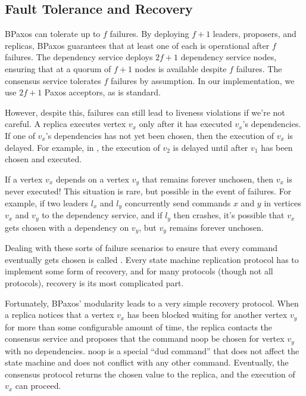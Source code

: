 \subsection{Fault Tolerance and Recovery}
BPaxos can tolerate up to $f$ failures. By deploying $f+1$ leaders, proposers,
and replicas, BPaxos guarantees that at least one of each is operational after
$f$ failures. The dependency service deploys $2f+1$ dependency service nodes,
ensuring that at a quorum of $f+1$ nodes is available despite $f$ failures. The
consensus service tolerates $f$ failures by assumption. In our implementation,
we use $2f+1$ Paxos acceptors, as is standard.

However, despite this, failures can still lead to liveness violations if we're
not careful. A replica executes vertex $v_x$ only after it has executed $v_x$'s
dependencies. If one of $v_x$'s dependencies has not yet been chosen, then the
execution of $v_x$ is delayed. For example, in ,
the execution of $v_2$ is delayed until after $v_1$ has been chosen and
executed.

If a vertex $v_x$ depends on a vertex $v_y$ that remains forever unchosen, then
$v_x$ is never executed! This situation is rare, but possible in the event of
failures. For example, if two leaders $l_x$ and $l_y$ concurrently send
commands $x$ and $y$ in vertices $v_x$ and $v_y$ to the dependency service, and
if $l_y$ then crashes, it's possible that $v_x$ gets chosen with a dependency
on $v_y$, but $v_y$ remains forever unchosen.

Dealing with these sorts of failure scenarios to ensure that every command
eventually gets chosen is called . Every state machine
replication protocol has to implement some form of recovery, and for many
protocols (though not all protocols), recovery is its most complicated part.

\newcommand{\noop}{\text{noop}}
Fortunately, BPaxos' modularity leads to a very simple recovery protocol. When
a replica notices that a vertex $v_x$ has been blocked waiting for another
vertex $v_y$ for more than some configurable amount of time, the replica
contacts the consensus service and proposes that the command $\noop$ be chosen
for vertex $v_y$ with no dependencies. $\noop$ is a special ``dud command''
that does not affect the state machine and does not conflict with any other
command. Eventually, the consensus protocol returns the chosen value to the
replica, and the execution of $v_x$ can proceed.
